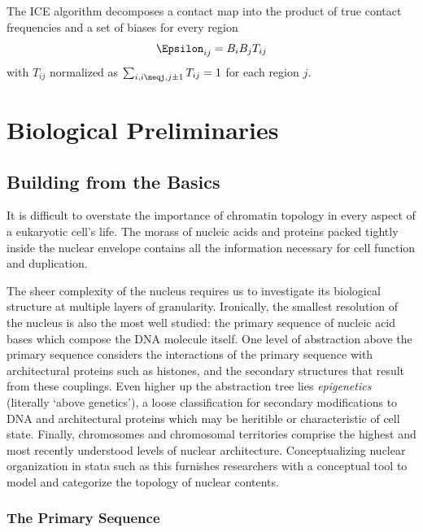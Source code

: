 \documentclass[phd,tocprelim]{cornell}
\begin{document}

The ICE algorithm decomposes a contact map into the product of true contact frequencies and a set of biases for every region 
\[
  \Epsilon_{ij} = B_{i}B_{j}T_{ij}
\]
with $T_{ij}$ normalized as $\sum_{i,i\neqj,j\pm1}T_{ij} = 1$ for each region $j$.



\chapter{Biological Preliminaries}

\section{Building from the Basics}

It is difficult to overstate the importance of chromatin topology in
every aspect of a eukaryotic cell's life.  The morass of nucleic acids and
proteins packed tightly inside the nuclear envelope contains all the
information necessary for cell function and duplication.

The sheer complexity of the nucleus requires us to investigate its biological
structure at multiple layers of granularity.  Ironically, the smallest resolution
of the nucleus is also the most well studied: the primary sequence of nucleic
acid bases which compose the DNA molecule itself.  One level of abstraction
above the primary sequence considers the interactions of the primary sequence
with architectural proteins such as histones, and the secondary structures that
result from these couplings.  Even higher up the abstraction tree lies
\textit{epigenetics} (literally `above genetics'\cite{dictepi2014}), a loose
classification for secondary modifications to DNA and architectural proteins
which may be heritible or characteristic of cell state.  Finally, chromosomes
and chromosomal territories comprise the highest and most recently understood
levels of nuclear architecture.  Conceptualizing nuclear organization in
stata such as this furnishes researchers with a conceptual tool to model
and categorize the topology of nuclear contents.

\subsection{The Primary Sequence}
\end{document}
